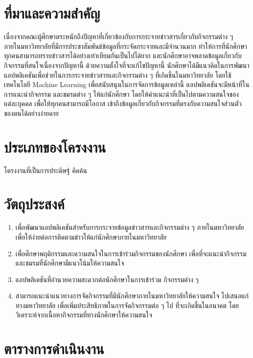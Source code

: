 \documentclass[14pt,oneside,openright,a4paper]{cpe-thai-project}
\begin{document}
\section{ที่มาและความสำคัญ}

เนื่องจากคณะผู้ศึกษาตระหนักถึงปัญหาที่เกี่ยวข้องกับการกระจายข่าวสารเกี่ยวกับกิจกรรมต่าง ๆ ภายในมหาวิทยาลัยที่มีการประชาสัมพันธ์ข้อมูลที่กระจัดกระจายและมีจำนวนมาก 
ทำให้การที่นักศึกษาทุกคนสามารถทราบข่าวสารได้อย่างเท่าเทียมกันเป็นไปได้ยาก และนักศึกษาอาจพลาดข้อมูลเกี่ยวกับกิจกรรมที่สนใจเนื่องจากปัญหานี้
ด้วยความตั้งใจที่จะแก้ไขปัญหานี้ นักศึกษาได้มีแนวคิดในการพัฒนา แอปพลิเคชันเพื่อช่วยในการกระจายข่าวสารและกิจกรรมต่าง ๆ ที่เกิดขึ้นในมหาวิทยาลัย 
โดยใช้เทคโนโลยี Machine Learning เพื่อสนับสนุนในการจัดการข้อมูลเหล่านี้ แอปพลิเคชันจะมีหน้าที่ในการแนะนำกิจกรรม และชมรมต่าง ๆ ให้แก่นักศึกษา 
โดยให้คำแนะนำที่เป็นไปตามความสนใจของแต่ละบุคคล เพื่อให้ทุกคนสามารถมีโอกาส เข้าถึงข้อมูลเกี่ยวกับกิจกรรมที่ตรงกับความสนใจส่วนตัวของตนได้อย่างง่ายดาย

\section{ประเภทของโครงงาน}

โครงงานที่เป็นการประดิษฐ์ คิดค้น

\section{วัตถุประสงค์}
  \begin{enumerate}
    \item เพื่อพัฒนาแอปพลิเคชันสำหรับการกระจายข้อมูลข่าวสารและกิจกรรมต่าง ๆ ภายในมหาวิทยาลัย เพื่อให้ง่ายต่อการติดตามข่าวให้แก่นักศึกษาภายในมหาวิทยาลัย 
    \item เพื่อศึกษาพฤติกรรมและความสนใจในการเข้าร่วมกิจกรรมของนักศึกษา เพื่อที่จะแนะนำกิจกรรมและชมรมที่นักศึกษามีแนวโน้มให้ความสนใจ
    \item แอปพลิเคชันที่อำนวยความสะดวกต่อนักศึกษาในการเข้าร่วม กิจกรรมต่าง ๆ 
    \item สามารถแนะนำแนวทางการจัดกิจกรรมที่มีนักศึกษาภายในมหาวิทยาลัยให้ความสนใจ ไปเสนอแก่ทางมหาวิทยาลัย เพื่อเพิ่มประสิทธิภาพในการจัดกิจกรรมต่อ ๆ ไป ที่จะเกิดขึ้นในอนาคต โดยวิเคราะห์จากเนื้อหากิจกรรมที่ทางนักศึกษาให้ความสนใจ
\end{enumerate}

\newpage

\section{ตารางการดำเนินงาน}
\end{document}
